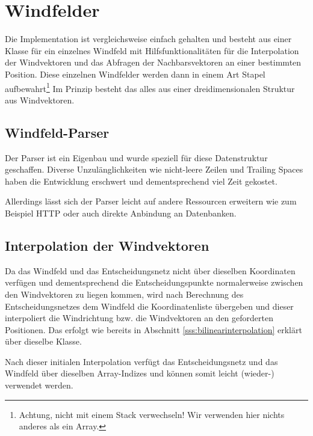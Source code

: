 \section{Windfelder}
Die Implementation ist vergleichsweise einfach gehalten und besteht aus
einer Klasse für ein einzelnes Windfeld mit Hilfsfunktionalitäten für
die Interpolation der Windvektoren und das Abfragen der Nachbarsvektoren
an einer bestimmten Position. Diese einzelnen Windfelder werden dann in
einem Art Stapel aufbewahrt\footnote{Achtung, nicht mit einem Stack
verwechseln! Wir verwenden hier nichts anderes als ein Array.} Im
Prinzip besteht das alles aus einer dreidimensionalen Struktur aus
Windvektoren.

\subsection{Windfeld-Parser}
Der Parser ist ein Eigenbau und wurde speziell für diese Datenstruktur
geschaffen. Diverse Unzulänglichkeiten wie nicht-leere Zeilen und
Trailing Spaces haben die Entwicklung erschwert und dementsprechend viel
Zeit gekostet.

Allerdings lässt sich der Parser leicht auf andere Ressourcen erweitern
wie zum Beispiel HTTP oder auch direkte Anbindung an Datenbanken.

\subsection{Interpolation der Windvektoren}
Da das Windfeld und das Entscheidungsnetz nicht über dieselben
Koordinaten verfügen und dementsprechend die Entscheidungspunkte
normalerweise zwischen den Windvektoren zu liegen kommen, wird nach
Berechnung des Entscheidungsnetzes dem Windfeld die Koordinatenliste
übergeben und dieser interpoliert die Windrichtung bzw. die Windvektoren
an den geforderten Positionen. Das erfolgt wie bereits in Abschnitt
\ref{sss:bilinearinterpolation} erklärt über dieselbe Klasse.

Nach dieser initialen Interpolation verfügt das Entscheidungsnetz und
das Windfeld über dieselben Array-Indizes und können somit leicht
(wieder-) verwendet werden.
